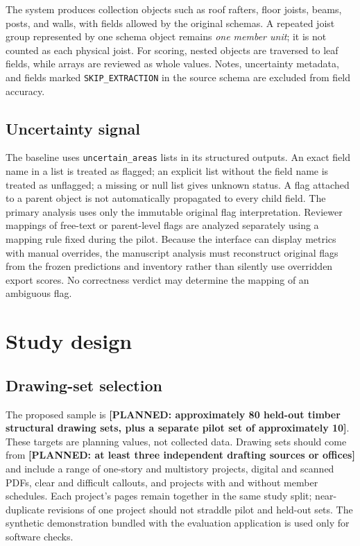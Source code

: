 \documentclass[11pt]{article}
\newcommand{\planned}[1]{\textcolor{blue!65!black}{\textbf{[PLANNED: #1]}}}
\begin{document}
The system produces collection objects such as roof rafters, floor joists, beams, posts, and walls, with fields allowed by the original schemas. A repeated joist group represented by one schema object remains \emph{one member unit}; it is not counted as each physical joist. For scoring, nested objects are traversed to leaf fields, while arrays are reviewed as whole values. Notes, uncertainty metadata, and fields marked \texttt{SKIP\_EXTRACTION} in the source schema are excluded from field accuracy.

\subsection{Uncertainty signal}
The baseline uses \texttt{uncertain\_areas} lists in its structured outputs. An exact field name in a list is treated as flagged; an explicit list without the field name is treated as unflagged; a missing or null list gives unknown status. A flag attached to a parent object is not automatically propagated to every child field. The primary analysis uses only the immutable original flag interpretation. Reviewer mappings of free-text or parent-level flags are analyzed separately using a mapping rule fixed during the pilot. Because the interface can display metrics with manual overrides, the manuscript analysis must reconstruct original flags from the frozen predictions and inventory rather than silently use overridden export scores. No correctness verdict may determine the mapping of an ambiguous flag.

\section{Study design}
\subsection{Drawing-set selection}
The proposed sample is \planned{approximately 80 held-out timber structural drawing sets, plus a separate pilot set of approximately 10}. These targets are planning values, not collected data. Drawing sets should come from \planned{at least three independent drafting sources or offices} and include a range of one-story and multistory projects, digital and scanned PDFs, clear and difficult callouts, and projects with and without member schedules. Each project's pages remain together in the same study split; near-duplicate revisions of one project should not straddle pilot and held-out sets. The synthetic demonstration bundled with the evaluation application is used only for software checks.
\end{document}
